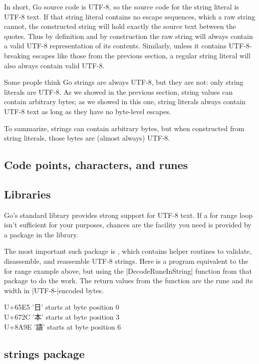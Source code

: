 In short, Go source code is UTF-8, so the source code for the string literal is UTF-8 text. If that string literal contains no escape sequences, which a raw string cannot, the constructed string will hold exactly the source text between the quotes. Thus by definition and by construction the raw string will always contain a valid UTF-8 representation of its contents. Similarly, unless it contains UTF-8-breaking escapes like those from the previous section, a regular string literal will also always contain valid UTF-8.

Some people think Go strings are always UTF-8, but they are not: only string literals are UTF-8. As we showed in the previous section, string values can contain arbitrary bytes; as we showed in this one, string literals always contain UTF-8 text as long as they have no byte-level escapes.

To summarize, strings can contain arbitrary bytes, but when constructed from string literals, those bytes are (almost always) UTF-8.

\subsection{Code points, characters, and runes}



\subsection{Libraries}

Go's standard library provides strong support for UTF-8 text. If a for range loop isn't sufficient for your purposes, chances are the facility you need is provided by a package in the library.

The most important such package is , which contains helper routines to validate, disassemble, and reassemble UTF-8 strings. Here is a program equivalent to the for range example above, but using the |DecodeRuneInString| function from that package to do the work. The return values from the function are the rune and its width in |UTF-8-|encoded bytes.

{\panunicode
U+65E5 '日' starts at byte position 0\\
U+672C '本' starts at byte position 3\\
U+8A9E '語' starts at byte position 6\\
}


\subsection{strings package}


